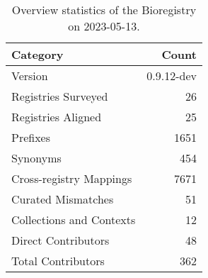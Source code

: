 \begin{table}
\caption{Overview statistics of the Bioregistry on 2023-05-13.}
\label{tab:bioregistry-summary}
\begin{tabular}{lr}
\toprule
Category & Count \\
\midrule
Version & 0.9.12-dev \\
Registries Surveyed & 26 \\
Registries Aligned & 25 \\
Prefixes & 1651 \\
Synonyms & 454 \\
Cross-registry Mappings & 7671 \\
Curated Mismatches & 51 \\
Collections and Contexts & 12 \\
Direct Contributors & 48 \\
Total Contributors & 362 \\
\bottomrule
\end{tabular}
\end{table}
